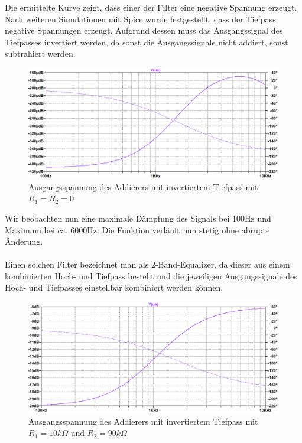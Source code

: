 Die ermittelte Kurve zeigt, dass einer der Filter eine negative Spannung erzeugt. Nach weiteren Simulationen mit Spice wurde festgestellt, dass der Tiefpass negative Spannungen erzeugt. Aufgrund dessen muss das Ausgangssignal des Tiefpasses invertiert werden, da sonst die Ausgangssignale nicht addiert, sonst subtrahiert werden.

\newpage

\begin{figure}[htb]
    \includegraphics[width=16cm]{./pictures/Gesamtschaltung_Invertiert}
    \caption{Ausgangsspannung des Addierers mit invertiertem Tiefpass mit $R_1 = R_2 = 0$}
    \label{fig:AddiererAusgangsspannungInvertiert}
\end{figure}

Wir beobachten nun eine maximale Dämpfung des Signals bei 100Hz und Maximum bei ca. 6000Hz. Die Funktion verläuft nun stetig ohne abrupte Änderung.
\\
\\
Einen solchen Filter bezeichnet man als 2-Band-Equalizer, da dieser aus einem kombinierten Hoch- und Tiefpass besteht und die jeweiligen Ausgangssignale des Hoch- und Tiefpasses einstellbar kombiniert werden können.

\begin{figure}[htb]
    \includegraphics[width=16cm]{./pictures/Gesamtschaltung_Invertiert_10_90}
    \caption{Ausgangsspannung des Addierers mit invertiertem Tiefpass mit $R_1 = 10k\Omega$ und $R_2 = 90k\Omega$}
    \label{fig:AddiererAusgangsspannungInvertiert}
\end{figure}

